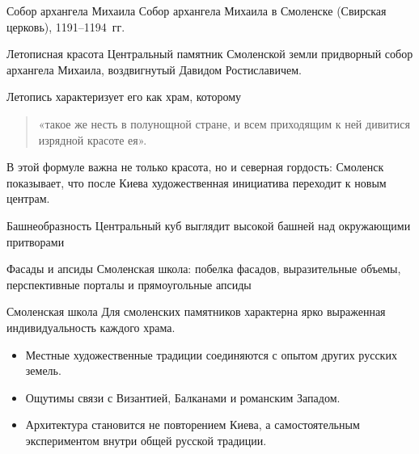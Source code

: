 \begin{frame}{Собор архангела Михаила}
    {Собор архангела Михаила в Смоленске
     (Свирская церковь), 1191--1194~гг.}
\end{frame}

\begin{frame}{Летописная красота}
  Центральный памятник Смоленской земли придворный собор
  архангела Михаила, воздвигнутый Давидом Ростиславичем.

  \vspace{1em}
  Летопись характеризует его как храм, которому
  \begin{quote}
    «такое же несть в полунощной стране, и всем приходящим
    к ней дивитися изрядной красоте ея».
  \end{quote}

  В этой формуле важна не только красота, но и северная гордость:
  Смоленск показывает, что после Киева художественная инициатива
  переходит к новым центрам.
\end{frame}

\begin{frame}{Башнеобразность}
    {Центральный куб выглядит высокой башней
     над окружающими притворами}
\end{frame}

\begin{frame}{Фасады и апсиды}
    {Смоленская школа: побелка фасадов,
     выразительные объемы, перспективные порталы
     и прямоугольные апсиды}
\end{frame}

\begin{frame}{Смоленская школа}
  Для смоленских памятников характерна ярко выраженная
  индивидуальность каждого храма.
  \begin{itemize}
    \item Местные художественные традиции соединяются с опытом
          других русских земель.
    \item Ощутимы связи с Византией, Балканами и романским Западом.
    \item Архитектура становится не повторением Киева, а самостоятельным
          экспериментом внутри общей русской традиции.
  \end{itemize}
\end{frame}

